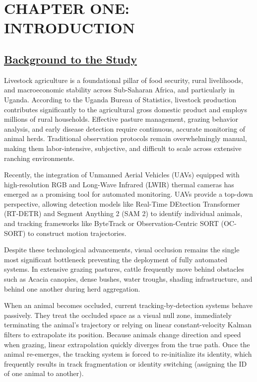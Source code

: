 \documentclass[12pt]{article}
\begin{document}
\setcounter{page}{1}

\section*{\centering \textbf{CHAPTER ONE: INTRODUCTION}}

\subsection*{\underline{\textbf{Background to the Study}}}
Livestock agriculture is a foundational pillar of food security, rural livelihoods, and macroeconomic stability across Sub-Saharan Africa, and particularly in Uganda. According to the Uganda Bureau of Statistics, livestock production contributes significantly to the agricultural gross domestic product and employs millions of rural households. Effective pasture management, grazing behavior analysis, and early disease detection require continuous, accurate monitoring of animal herds. Traditional observation protocols remain overwhelmingly manual, making them labor-intensive, subjective, and difficult to scale across extensive ranching environments.

Recently, the integration of Unmanned Aerial Vehicles (UAVs) equipped with high-resolution RGB and Long-Wave Infrared (LWIR) thermal cameras has emerged as a promising tool for automated monitoring. UAVs provide a top-down perspective, allowing detection models like Real-Time DEtection Transformer (RT-DETR) and Segment Anything 2 (SAM 2) to identify individual animals, and tracking frameworks like ByteTrack or Observation-Centric SORT (OC-SORT) to construct motion trajectories.

Despite these technological advancements, visual occlusion remains the single most significant bottleneck preventing the deployment of fully automated systems. In extensive grazing pastures, cattle frequently move behind obstacles such as Acacia canopies, dense bushes, water troughs, shading infrastructure, and behind one another during herd aggregation. 

When an animal becomes occluded, current tracking-by-detection systems behave passively. They treat the occluded space as a visual null zone, immediately terminating the animal's trajectory or relying on linear constant-velocity Kalman filters to extrapolate its position. Because animals change direction and speed when grazing, linear extrapolation quickly diverges from the true path. Once the animal re-emerges, the tracking system is forced to re-initialize its identity, which frequently results in track fragmentation or identity switching (assigning the ID of one animal to another). 
\end{document}
